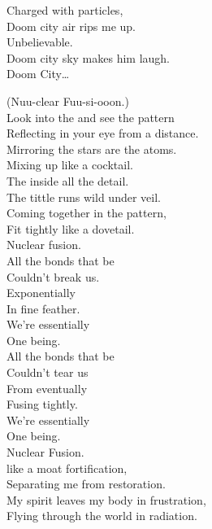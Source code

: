 Charged with particles, \\
Doom city air rips me up. \\
Unbelievable. \\
Doom city sky makes him laugh. \\

Doom City… \\





(Nuu-clear Fuu-si-ooon.) \\

Look into the  and see the pattern \\
Reflecting in your eye from a distance. \\
Mirroring the stars are the atoms. \\
Mixing up like a cocktail. \\

The  inside all the detail. \\
The tittle runs wild under veil. \\
Coming together in the pattern, \\
Fit tightly like a dovetail. \\

Nuclear fusion. \\

All the bonds that be \\
Couldn't break us. \\
Exponentially \\
In fine feather. \\
We're essentially \\
One being. \\

All the bonds that be \\
Couldn't tear us \\
From eventually \\
Fusing tightly. \\
We're essentially \\
One being. \\
Nuclear Fusion. \\

 like a moat fortification, \\
Separating me from restoration. \\
My spirit leaves my body in frustration, \\
Flying through the world in radiation. \\

